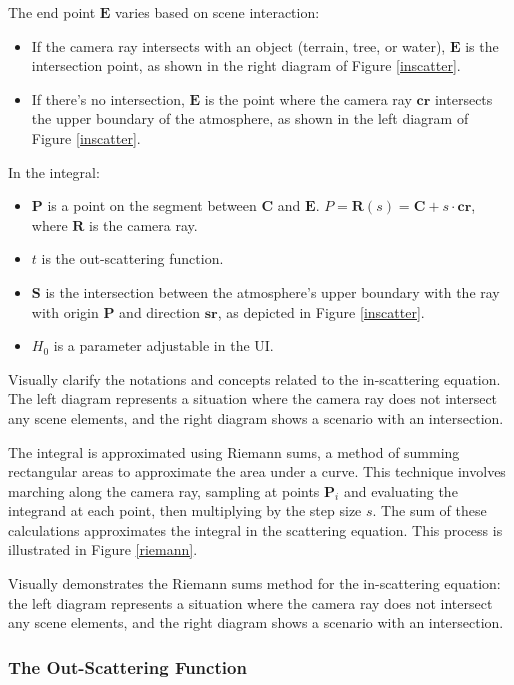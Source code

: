 The end point $\mathbf{E}$ varies based on scene interaction:
\begin{itemize}
    \item If the camera ray intersects with an object (terrain, tree, or water), $\mathbf{E}$ is the intersection point, as shown in the right diagram of Figure \ref{inscatter}.
    \item If there's no intersection, $\mathbf{E}$ is the point where the camera ray $\mathbf{cr}$ intersects the upper boundary of the atmosphere, as shown in the left diagram of Figure \ref{inscatter}.
\end{itemize}

In the integral:
\begin{itemize}
    \item $\mathbf{P}$ is a point on the segment between $\mathbf{C}$ and $\mathbf{E}$. $P = \mathbf{R}(s) = \mathbf{C} + s \cdot \mathbf{cr}$, where $\mathbf{R}$ is the camera ray.
    \item $t$ is the out-scattering function.
    \item $\mathbf{S}$ is the intersection between the atmosphere's upper boundary with the ray with origin $\mathbf{P}$ and direction $\mathbf{sr}$, as depicted in Figure \ref{inscatter}.
    \item $H_0$ is a parameter adjustable in the UI.
\end{itemize}

{Visually clarify the notations and concepts related to the in-scattering equation. The left diagram represents a situation where the camera ray does not intersect any scene elements, and the right diagram shows a scenario with an intersection.}

The integral is approximated using Riemann sums, a method of summing rectangular areas to approximate the area under a curve. This technique involves marching along the camera ray, sampling at points $\mathbf{P}_i$ and evaluating the integrand at each point, then multiplying by the step size $s$. The sum of these calculations approximates the integral in the scattering equation. This process is illustrated in Figure \ref{riemann}.

{Visually demonstrates the Riemann sums method for the in-scattering equation: the left diagram represents a situation where the camera ray does not intersect any scene elements, and the right diagram shows a scenario with an intersection.}

\subsubsection{The Out-Scattering Function}

